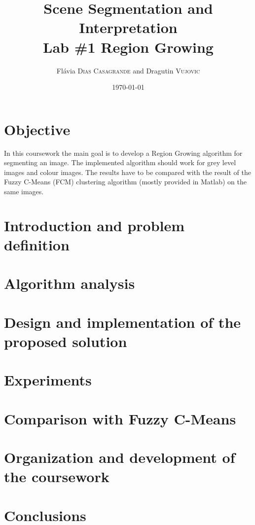 \documentclass{article}
\title{Scene Segmentation and Interpretation\\Lab \#1 Region Growing} %
\author{Fl\'{a}via \textsc{Dias Casagrande} and Dragutin \textsc{Vujovic}} %
\date{\today} %
\begin{document}
\maketitle %



\section{Objective}

In this coursework the main goal is to develop a Region Growing algorithm for segmenting an image. The implemented algorithm should work for grey level images and colour images. The results have to be compared with the result of the Fuzzy C-Means (FCM) clustering algorithm (mostly provided in Matlab) on the same images.
 

\section{Introduction and problem definition}

\section{Algorithm analysis}

\section{Design and implementation of the proposed solution}

\section{Experiments}

\section{Comparison with Fuzzy C-Means}

\section{Organization and development of the coursework}

\section{Conclusions}
\end{document}
